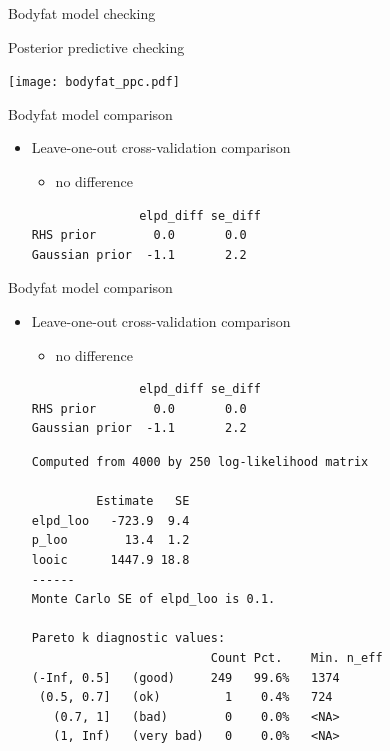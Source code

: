 \documentclass[english,t]{beamer}
\begin{document}
\begin{frame}
  
  {\Large\color{navyblue} Bodyfat model checking}

  Posterior predictive checking
  
  \texttt{[image: bodyfat\_ppc.pdf]}

\end{frame}

\begin{frame}[fragile]
  
  {\Large\color{navyblue} Bodyfat model comparison}

  \begin{itemize}
  \item Leave-one-out cross-validation comparison
    \begin{itemize}
    \item no difference
    \end{itemize}
    {\footnotesize
\begin{lstlisting}
               elpd_diff se_diff
RHS prior        0.0       0.0   
Gaussian prior  -1.1       2.2   
\end{lstlisting}
  }
\end{itemize}

\end{frame}

\begin{frame}[fragile]
  
  {\Large\color{navyblue} Bodyfat model comparison}

  \begin{itemize}
  \item Leave-one-out cross-validation comparison
    \begin{itemize}
    \item no difference
    \end{itemize}
    {\scriptsize
\begin{lstlisting}
               elpd_diff se_diff
RHS prior        0.0       0.0   
Gaussian prior  -1.1       2.2   
\end{lstlisting}
  }
    {\scriptsize
\begin{lstlisting}
Computed from 4000 by 250 log-likelihood matrix

         Estimate   SE
elpd_loo   -723.9  9.4
p_loo        13.4  1.2
looic      1447.9 18.8
------
Monte Carlo SE of elpd_loo is 0.1.

Pareto k diagnostic values:
                         Count Pct.    Min. n_eff
(-Inf, 0.5]   (good)     249   99.6%   1374      
 (0.5, 0.7]   (ok)         1    0.4%   724       
   (0.7, 1]   (bad)        0    0.0%   <NA>      
   (1, Inf)   (very bad)   0    0.0%   <NA>      
\end{lstlisting}
  }

\end{itemize}

\end{frame}
\end{document}
